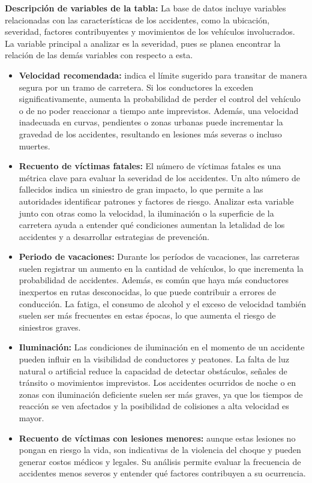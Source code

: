 \documentclass{book}
\begin{document}
\textbf{Descripción de variables de la tabla:} La base de datos incluye variables relacionadas con las características de los accidentes, como la ubicación, severidad, factores contribuyentes y movimientos de los vehículos involucrados. La variable principal a analizar es la severidad, pues se planea encontrar la relación de las demás variables con respecto a esta.

\begin{itemize}
    \item \textbf{Velocidad recomendada:}  indica el límite sugerido para transitar de manera segura por un tramo de carretera. Si los conductores la exceden significativamente, aumenta la probabilidad de perder el control del vehículo o de no poder reaccionar a tiempo ante imprevistos. Además, una velocidad inadecuada en curvas, pendientes o zonas urbanas puede incrementar la gravedad de los accidentes, resultando en lesiones más severas o incluso muertes.
    \item \textbf{Recuento de víctimas fatales:} El número de víctimas fatales es una métrica clave para evaluar la severidad de los accidentes. Un alto número de fallecidos indica un siniestro de gran impacto, lo que permite a las autoridades identificar patrones y factores de riesgo. Analizar esta variable junto con otras como la velocidad, la iluminación o la superficie de la carretera ayuda a entender qué condiciones aumentan la letalidad de los accidentes y a desarrollar estrategias de prevención.
    \item \textbf{Periodo de vacaciones:} Durante los períodos de vacaciones, las carreteras suelen registrar un aumento en la cantidad de vehículos, lo que incrementa la probabilidad de accidentes. Además, es común que haya más conductores inexpertos en rutas desconocidas, lo que puede contribuir a errores de conducción. La fatiga, el consumo de alcohol y el exceso de velocidad también suelen ser más frecuentes en estas épocas, lo que aumenta el riesgo de siniestros graves.
    \item \textbf{Iluminación:} Las condiciones de iluminación en el momento de un accidente pueden influir en la visibilidad de conductores y peatones. La falta de luz natural o artificial reduce la capacidad de detectar obstáculos, señales de tránsito o movimientos imprevistos. Los accidentes ocurridos de noche o en zonas con iluminación deficiente suelen ser más graves, ya que los tiempos de reacción se ven afectados y la posibilidad de colisiones a alta velocidad es mayor.
    \item \textbf{Recuento de víctimas con lesiones menores:} aunque estas lesiones no pongan en riesgo la vida, son indicativas de la violencia del choque y pueden generar costos médicos y legales. Su análisis permite evaluar la frecuencia de accidentes menos severos y entender qué factores contribuyen a su ocurrencia.

\end{itemize}
\end{document}
